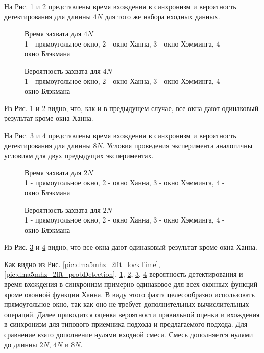 На Рис. \ref{pic:dma5mhz_4fft_lockTime} и \ref{pic:dma5mhz_4fft_probDetection} представлены время вхождения в синхронизм и вероятность детектирования для длинны ${4N}$
для того же набора входных данных.
\begin{figure}[h]
\center{}
	\caption{Время захвата для ${4N}$ \\ 1 - прямоугольное окно, 2 - окно Ханна, 3 - окно Хэмминга, 4 - окно Блэкмана}
	\label{pic:dma5mhz_4fft_lockTime}
\end{figure}
\begin{figure}[h]
\center{}
	\caption{Вероятность захвата для ${4N}$ \\ 1 - прямоугольное окно, 2 - окно Ханна, 3 - окно Хэмминга, 4 - окно Блэкмана}
	\label{pic:dma5mhz_4fft_probDetection}
\end{figure}
Из Рис. \ref{pic:dma5mhz_4fft_lockTime} и \ref{pic:dma5mhz_4fft_probDetection} видно, что, как и в предыдущем случае, все окна дают одинаковый результат кроме окна Ханна.

На Рис. \ref{pic:dma5mhz_8fft_lockTime} и \ref{pic:dma5mhz_8fft_probDetection} представлены время вхождения в синхронизм и вероятность детектирования для длинны ${8N}$. Условия
проведения эксперимента аналогичны условиям для двух предыдущих экспериментах.
\begin{figure}[h]
\center{}
	\caption{Время захвата для ${2N}$ \\ 1 - прямоугольное окно, 2 - окно Ханна, 3 - окно Хэмминга, 4 - окно Блэкмана}
	\label{pic:dma5mhz_8fft_lockTime}
\end{figure}
\begin{figure}[h]
\center{}
	\caption{Вероятность захвата для ${2N}$ \\ 1 - прямоугольное окно, 2 - окно Ханна, 3 - окно Хэмминга, 4 - окно Блэкмана}
	\label{pic:dma5mhz_8fft_probDetection}
\end{figure}
Из Рис. \ref{pic:dma5mhz_8fft_lockTime} и \ref{pic:dma5mhz_8fft_probDetection} видно, что все окна дают одинаковый результат кроме окна Ханна.

Как видно из Рис. \ref{pic:dma5mhz_2fft_lockTime}, \ref{pic:dma5mhz_2fft_probDetection}, \ref{pic:dma5mhz_4fft_lockTime}, \ref{pic:dma5mhz_4fft_probDetection},
\ref{pic:dma5mhz_8fft_lockTime}, \ref{pic:dma5mhz_8fft_probDetection} вероятность детектирования и время вхождения в синхронизм примерно одинаковое для всех оконных функций
кроме оконной функции Ханна. В виду этого факта целесообразно использовать прямоугольное окно, так как оно не требует дополнительных вычислительных операций.
Далее приводится оценка вероятности правильной оценки и вхождения в синхронизм для типового приемника подхода и предлагаемого подхода. Для сравнение взято дополнение нулями входной смеси.
Смесь дополняется нулями до длинны ${2N}$, ${4N}$ и ${8N}$.

